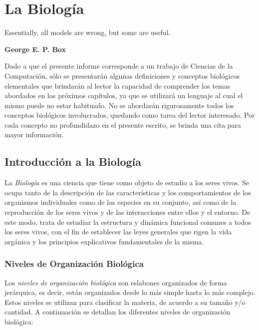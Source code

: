 \chapter{La Biología}
\label{biologia}

\epigraph{Essentially, all models are wrong,
but some are useful.}%
{\textbf{George E. P. Box}}

\par Dado a que el presente informe corresponde a un trabajo de Ciencias de la Computación, sólo se presentarán algunas definiciones y conceptos biológicos elementales que brindarán al lector la capacidad de comprender los temas abordados en los próximos capítulos, ya que se utilizará un lenguaje al cual el mismo puede no estar habituado. No se abordarán rigurosamente todos los conceptos biológicos involucrados, quedando como tarea del lector interesado. Por cada concepto no profundidazo en el presente escrito, se brinda una cita para mayor información.

\section{Introducción a la Biología}

\par La \emph{Biología} es una ciencia que tiene como objeto de estudio a los seres vivos. Se ocupa tanto de la descripción de las características y los comportamientos de los organismos individuales como de las especies en su conjunto, así como de la reproducción de los seres vivos y de las interacciones entre ellos y el entorno. De este modo, trata de estudiar la estructura y dinámica funcional comunes a todos los seres vivos, con el fin de establecer las leyes generales que rigen la vida orgánica y los principios explicativos fundamentales de la misma\cite{curtis}. 

\subsection{Niveles de Organización Biológica}
\par Los \emph{niveles de organización biológica} son eslabones organizados de forma jerárquica, es decir, están organizados desde lo más simple hasta lo más complejo. Estos niveles se utilizan para clasificar la materia, de acuerdo a su tamaño y/o cantidad. A continuación se detallan los diferentes niveles de organización biológica:

